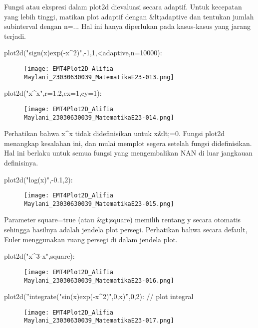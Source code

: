 \documentclass{article}
\begin{document}
Fungsi atau ekspresi dalam plot2d dievaluasi secara adaptif. Untuk
kecepatan yang lebih tinggi, matikan plot adaptif dengan &lt;adaptive dan
tentukan jumlah subinterval dengan n=... Hal ini hanya diperlukan pada
kasus-kasus yang jarang terjadi.


\>plot2d("sign(x)\*exp(-x^2)",-1,1,<adaptive,n=10000):

\begin{figure}
    \centering
    \texttt{[image: EMT4Plot2D\_Alifia Maylani\_23030630039\_MatematikaE23-013.png]}
    \caption{}
    \label{fig:enter-label}
\end{figure}

\>plot2d("x^x",r=1.2,cx=1,cy=1):


\begin{figure}
    \centering
    \texttt{[image: EMT4Plot2D\_Alifia Maylani\_23030630039\_MatematikaE23-014.png]}
    \caption{}
    \label{fig:enter-label}
\end{figure}

Perhatikan bahwa x^x tidak didefinisikan untuk x&lt;=0. Fungsi plot2d
menangkap kesalahan ini, dan mulai memplot segera setelah fungsi
didefinisikan. Hal ini berlaku untuk semua fungsi yang mengembalikan
NAN di luar jangkauan definisinya.


\>plot2d("log(x)",-0.1,2):


\begin{figure}
    \centering
    \texttt{[image: EMT4Plot2D\_Alifia Maylani\_23030630039\_MatematikaE23-015.png]}
    \caption{}
    \label{fig:enter-label}
\end{figure}

Parameter square=true (atau &gt;square) memilih rentang y secara otomatis
sehingga hasilnya adalah jendela plot persegi. Perhatikan bahwa secara
default, Euler menggunakan ruang persegi di dalam jendela plot.


\>plot2d("x^3-x",\>square):


\begin{figure}
    \centering
    \texttt{[image: EMT4Plot2D\_Alifia Maylani\_23030630039\_MatematikaE23-016.png]}
    \caption{}
    \label{fig:enter-label}
\end{figure}

\>plot2d(''integrate("sin(x)\*exp(-x^2)",0,x)'',0,2): // plot integral


\begin{figure}
    \centering
    \texttt{[image: EMT4Plot2D\_Alifia Maylani\_23030630039\_MatematikaE23-017.png]}
    \caption{}
    \label{fig:enter-label}
\end{figure}
\end{document}
